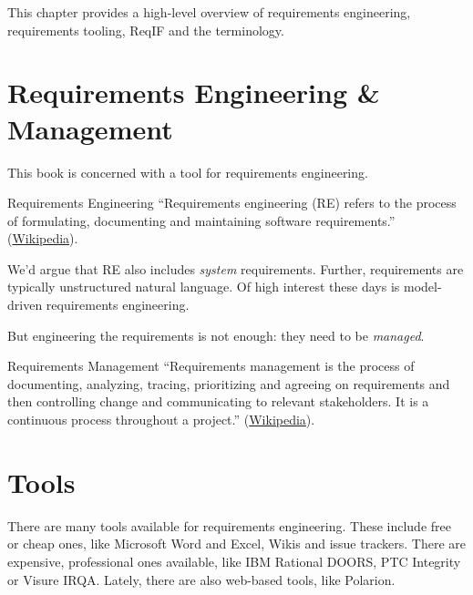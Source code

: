 This chapter provides a high-level overview of requirements engineering, requirements tooling, ReqIF and the terminology.

\section{Requirements Engineering \& Management}
\label{sec:requirements_engineering}

This book is concerned with \pror{} a tool for requirements engineering.

\begin{definition}{Requirements Engineering}
``Requirements engineering (RE) refers to the process of formulating, documenting and maintaining software requirements.'' (\href{http://en.wikipedia.org/wiki/Requirements_engineering}{Wikipedia}).

We'd argue that RE also includes \textit{system} requirements.  Further, requirements are typically unstructured natural language.  Of high interest these days is model-driven requirements engineering.
\end{definition}

But engineering the requirements is not enough: they need to be \textit{managed}.

\begin{definition}{Requirements Management}
``Requirements management is the process of documenting, analyzing, tracing, prioritizing and agreeing on requirements and then controlling change and communicating to relevant stakeholders. It is a continuous process throughout a project.'' (\href{http://en.wikipedia.org/wiki/Requirements_management}{Wikipedia}).
\end{definition}

\section{Tools}
\label{sec:re-tools}

There are many tools available for requirements engineering.  These include free or cheap ones, like Microsoft Word and Excel, Wikis and issue trackers.  There are expensive, professional ones available, like IBM\textregistered{} Rational\textregistered{} DOORS\textregistered{}, PTC Integrity or Visure IRQA.  Lately, there are also web-based tools, like Polarion.

